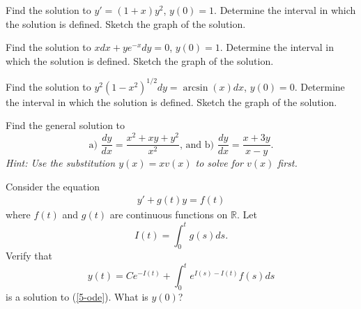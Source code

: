\documentclass[12pt,letterpaper]{hmcpset}
\newcommand{\RR}{\mathbb{R}}
\begin{document}

\begin{problem}[1]
    Find the solution to $y' = (1 + x)y^2$, $y(0) = 1$.
    Determine the interval in which the solution
    is defined. Sketch the graph of the solution.
\end{problem}

\begin{solution}
    \vfill
\end{solution}
\clearpage

\begin{problem}[2]
    Find the solution to $xdx + ye^{-x}dy = 0$,
    $y(0) = 1$. Determine the interval in which the
    solution is defined. Sketch the graph of the solution.
\end{problem}

\begin{solution}
    \vfill
\end{solution}
\clearpage

\begin{problem}[3]
    Find the solution to $y^2(1 - x^2)^{1/2}dy =
    \arcsin(x)dx$, $y(0) = 0$. Determine the interval in
    which the solution is defined. Sketch the graph
    of the solution.
\end{problem}

\begin{solution}
    \vfill
\end{solution}
\clearpage

\begin{problem}[4]
    Find the general solution to
    \[
        \text{a) } \frac{dy}{dx} = \frac{x^2+xy+y^2}{x^2}\text{, and b) }\frac{dy}{dx} = \frac{x+3y}{x-y}.
    \]
    \textit{Hint: Use the substitution $y(x) = xv(x)$ to solve for $v(x)$ first.}
\end{problem}

\begin{solution}
    \vfill
\end{solution}
\clearpage

\begin{problem}[5]
    Consider the equation
    \begin{align}
        y'+g(t)y = f(t)\label{5-ode}
    \end{align}
    where $f(t)$ and $g(t)$ are continuous functions on
    $\RR$. Let
    \[
        I(t) = \int_0^t g(s)ds.
    \]
    Verify that
    \[
        y(t) = Ce^{-I(t)}+\int_0^t e^{I(s)-I(t)}f(s)ds
    \]
    is a solution to (\ref{5-ode}). What is $y(0)$?
\end{problem}
\end{document}
